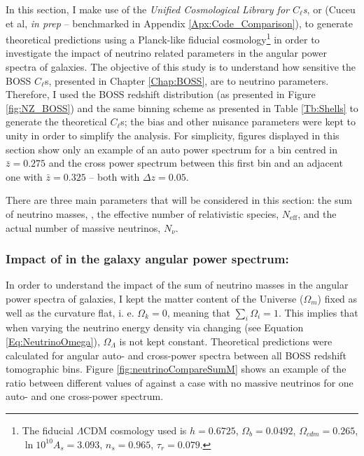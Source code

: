 \qquad In this section, I make use of the \textit{Unified Cosmological Library for $C_{\ell}$s}, or \uclcl (Cuceu et al, \textit{in prep} -- benchmarked in Appendix \ref{Apx:Code_Comparison}), to generate theoretical predictions using a Planck-like fiducial cosmology\footnote{The fiducial $\Lambda$CDM cosmology used is $h=0.6725$, $\Omega_b = 0.0492$, $\Omega_{cdm} = 0.265$, $\ln 10^{10}A_s = 3.093$, $n_s = 0.965$, $\tau_r = 0.079$.} in order to investigate the impact of neutrino related parameters in the angular power spectra of galaxies. The objective of this study is to understand how sensitive the BOSS $C_{\ell}$s, presented in Chapter \ref{Chap:BOSS}, are to neutrino parameters. Therefore, I used the BOSS redshift distribution (as presented in Figure \ref{fig:NZ_BOSS}) and the same binning scheme as presented in Table \ref{Tb:Shells} to generate the theoretical $C_{\ell}$s; the bias and other nuisance parameters were kept to unity in order to simplify the analysis. For simplicity, figures displayed in this section show only an example of an auto power spectrum for a bin centred in $\bar{z} = 0.275$ and the cross power spectrum between this first bin and an adjacent one with $\bar{z} = 0.325$ -- both with $\Delta z = 0.05$.

\qquad There are three main parameters that will be considered in this section: the sum of neutrino masses, \NM{}, the effective number of relativistic species, $N_{\text{eff}}$, and the actual number of massive neutrinos, $N_{\nu}$.

\subsubsection{Impact of \NM{} in the galaxy angular power spectrum:}
In order to understand the impact of the sum of neutrino masses in the angular power spectra of galaxies, I kept the matter content of the Universe ($\Omega_m$) fixed as well as the curvature flat, i. e. $\Omega_{k} = 0$, meaning that $\sum_i \Omega_i = 1$. This implies that when varying the neutrino energy density via changing \NM{} (see Equation \ref{Eq:NeutrinoOmega}), $\Omega_{\Lambda}$ is not kept constant. Theoretical predictions were calculated for angular auto- and cross-power spectra between all BOSS redshift tomographic bins. Figure \ref{fig:neutrinoCompareSumM} shows an example of the ratio between different values of \NM{} against a case with no massive neutrinos for one auto- and one cross-power spectrum.


